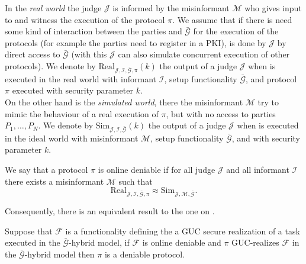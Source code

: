 \documentclass{acm_proc_article-sp}
\begin{document}
In the \textit{real world} the judge $\mathcal{J}$ is informed by the misinformant
$\mathcal{M}$ who gives input to and witness the execution of the protocol $\pi$. We assume that if there is
need some kind of interaction between the parties and $\bar{\mathcal{G}}$ for the execution of the protocols
(for example the parties need to register in a PKI), is done by $\mathcal{J}$ by direct access to
$\bar{\mathcal{G}}$ (with this $\mathcal{J}$ can also simulate concurrent execution of other protocols).
We denote by $\mathrm{Real}_{\mathcal{J, I,\bar{\mathcal{G}}},\pi}(k)$
the output of a judge $\mathcal{J}$ when is
executed in the real world with informant $\mathcal{I}$, setup functionality $\bar{\mathcal{G}}$, and
protocol $\pi$ executed with security parameter $k$.\\
On the other hand is the \textit{simulated world}, there the misinformant $\mathcal{M}$
try to mimic the behaviour of a real execution of $\pi$, but with no access to parties
$P_1, \ldots, P_N$. We denote by $\mathrm{Sim}_{\mathcal{J, I,\bar{\mathcal{G}}}}(k)$
the output of a
judge $\mathcal{J}$ when is executed in the ideal world with misinformant $\mathcal{M}$,
setup functionality $\bar{\mathcal{G}}$, and with security parameter $k$.

\begin{definition}
We say that a protocol $\pi$ is online deniable if for all judge $\mathcal{J}$ and all informant
$\mathcal{I}$ there exists a misinformant $\mathcal{M}$ such that
$$
\mathrm{Real}_{\mathcal{J, I,\bar{\mathcal{G}}},\pi}
\approx
\mathrm{Sim}_{\mathcal{J, M,\bar{\mathcal{G}}}}.
$$
\end{definition}

Consequently, there is an equivalent result to the one on
\cite{conf/tcc/DodisKSW09}.

\begin{theorem}
Suppose that $\mathcal{F}$ is a functionality defining the a GUC secure
realization of a task executed in the $\bar{\mathcal{G}}$-hybrid model, if $\mathcal{F}$ is online
deniable and $\pi$ GUC-realizes $\mathcal{F}$ in the $\bar{\mathcal{G}}$-hybrid model
then $\pi$ is a deniable protocol.
\label{teo:guc_den}
\end{theorem}
\end{document}
